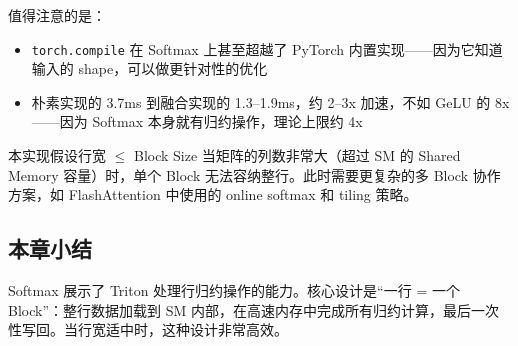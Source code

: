 值得注意的是：
\begin{itemize}
    \item \texttt{torch.compile} 在 Softmax 上甚至超越了 PyTorch 内置实现——因为它知道输入的 shape，可以做更针对性的优化
    \item 朴素实现的 3.7ms 到融合实现的 1.3--1.9ms，约 2--3x 加速，不如 GeLU 的 8x——因为 Softmax 本身就有归约操作，理论上限约 4x
\end{itemize}

\begin{warningbox}{本实现假设行宽 $\leq$ Block Size}
当矩阵的列数非常大（超过 SM 的 Shared Memory 容量）时，单个 Block 无法容纳整行。此时需要更复杂的多 Block 协作方案，如 FlashAttention 中使用的 online softmax 和 tiling 策略。
\end{warningbox}

\subsection{本章小结}

Softmax 展示了 Triton 处理行归约操作的能力。核心设计是``一行 = 一个 Block''：整行数据加载到 SM 内部，在高速内存中完成所有归约计算，最后一次性写回。当行宽适中时，这种设计非常高效。



